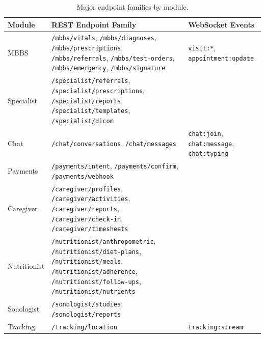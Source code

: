 \documentclass[conference]{IEEEtran}
\begin{document}
\begin{table}[H]
\centering
\small
\renewcommand{\arraystretch}{1.2}
\begin{tabularx}{\textwidth}{>{\raggedright\arraybackslash}p{} >{\raggedright\arraybackslash}X >{\raggedright\arraybackslash}X}
\toprule
\textbf{Module} & \textbf{REST Endpoint Family} & \textbf{WebSocket Events} \\
\midrule
MBBS & \texttt{/mbbs/vitals}, \texttt{/mbbs/diagnoses}, \texttt{/mbbs/prescriptions}, \texttt{/mbbs/referrals}, \texttt{/mbbs/test-orders}, \texttt{/mbbs/emergency}, \texttt{/mbbs/signature} & \texttt{visit:*}, \texttt{appointment:update} \\
Specialist & \texttt{/specialist/referrals}, \texttt{/specialist/prescriptions}, \texttt{/specialist/reports}, \texttt{/specialist/templates}, \texttt{/specialist/dicom} & \multicolumn{1}{c}{---} \\
Chat & \texttt{/chat/conversations}, \texttt{/chat/messages} & \texttt{chat:join}, \texttt{chat:message}, \texttt{chat:typing} \\
Payments & \texttt{/payments/intent}, \texttt{/payments/confirm}, \texttt{/payments/webhook} & \multicolumn{1}{c}{---} \\
Caregiver & \texttt{/caregiver/profiles}, \texttt{/caregiver/activities}, \texttt{/caregiver/reports}, \texttt{/caregiver/check-in}, \texttt{/caregiver/timesheets} & \multicolumn{1}{c}{---} \\
Nutritionist & \texttt{/nutritionist/anthropometric}, \texttt{/nutritionist/diet-plans}, \texttt{/nutritionist/meals}, \texttt{/nutritionist/adherence}, \texttt{/nutritionist/follow-ups}, \texttt{/nutritionist/nutrients} & \multicolumn{1}{c}{---} \\
Sonologist & \texttt{/sonologist/studies}, \texttt{/sonologist/reports} & \multicolumn{1}{c}{---} \\
Tracking & \texttt{/tracking/location} & \texttt{tracking:stream} \\
\bottomrule
\end{tabularx}
\caption{Major endpoint families by module.}
\label{tab:api}
\end{table}
\end{document}
